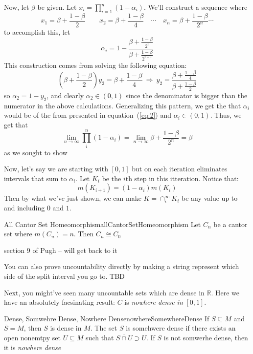 \documentclass[oneside]{book}
\newcommand{\R}{\mathbb{R}}
\newcommand{\sse}{\subseteq}
\newcommand{\oln}{\overline}
\newcommand{\rw}{\rightarrow}
\newcommand{\Rw}{\Rightarrow}
\begin{document}
\begin{Proof}
	Now, let $\beta$ be given. Let $x_i = \prod_{i=1}^n (1-\alpha_i)$. We'll construct a sequence where
	\[
		x_1 = \beta + \frac{1-\beta}{2} \qquad x_2 = \beta + \frac{1-\beta}{4} \quad\cdots\quad x_n = \beta
		+ \frac{1-\beta}{2^n} \cdots
	\]
	to accomplish this, let
	\begin{equation}\label{eq:2}
		\alpha_i = 1 - \frac{\beta + \frac{1-\beta}{2^i}}{\beta + \frac{1-\beta}{2^{i-1}}}
	\end{equation}
	This construction comes from solving the following equation:
	\[
		\left(\beta + \frac{1-\beta}{2}\right)y_2 = \beta + \frac{1-\beta}{4}\ \Rw\ y_2 = \frac{\beta
		+ \frac{1-\beta}{4}}{\beta + \frac{1-\beta}{2}}
	\]
	so $\alpha_2 = 1 - y_2$, and clearly $\alpha_2 \in (0,1)$ since the denominator is bigger than the
	numerator in the above calculations. Generalizing this pattern, we get the that $\alpha_i$ would be of the from
	presented in equation~(\ref{eq:2}) and $\alpha_i \in (0,1)$. Thus, we get that
	\[
		\lim_{n \rw \infty} \prod_i^n (1-\alpha_i) = \lim_{n \rw \infty} \beta + \frac{1-\beta}{2^n}
		= \beta
	\]
	as we sought to show
\end{Proof}

Now, let's say we are starting with $[0,1]$ but on each iteration eliminates intervals that sum to $\alpha_i$. Let $K_i$
be the $i$th step in this itteration. Notice that:
\[
	m(K_{i+1}) = (1-\alpha_i)m(K_i)
\]
Then by what we've just shown, we can make $K = \cap_i^\infty K_i$ be any value up to and including $0$ and $1$. 



\begin{prop}{All Cantor Set Homeomorphism}{allCantorSetHomeomorphism}
	Let $C_n$ be a cantor set where $m(C_n) = n$. Then $C_n \cong C_0$
\end{prop}

\begin{Proof}
	section 9 of Pugh -- will get back to it
\end{Proof}


You can also prove uncountability directly by making a string represent which side of the split interval you go to. TBD

Next, you might've seen many uncountable sets which are dense in $\R$. Here we have an absolutely facsinating result:
$C$ is \emph{nowhere dense in }$[0,1]$. 

\begin{defn}{Dense, Somwehre Dense, Nowhere Dense}{nowhereSomewhereDense}
	If $S \sse M$ and $\oln{S} = M$, then $S$ is dense in $M$. The set $S$ is somehwere dense if there exists an open
	nonemtpy set $U\sse M$ such that $\oln{S\cap U} \supset U$. If $S$ is not somwerhe dense, then it is \emph{nowhere
	dense}
\end{defn}
\end{document}
